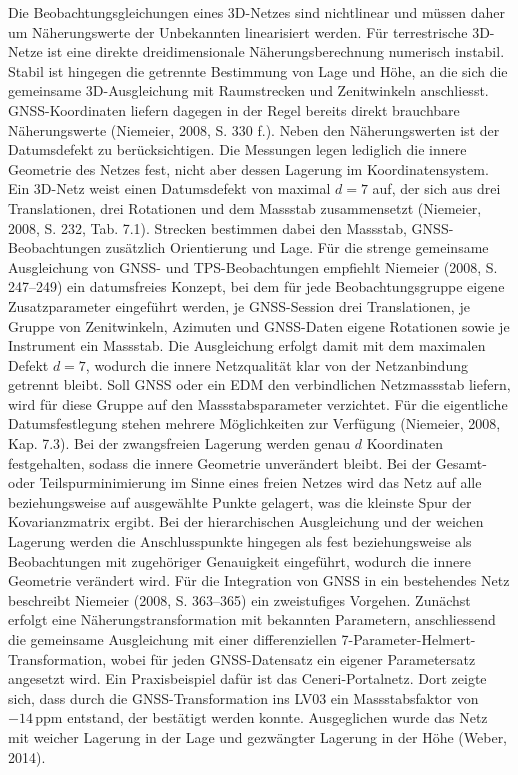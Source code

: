 Die Beobachtungsgleichungen eines 3D-Netzes sind nichtlinear und müssen daher um Näherungswerte der Unbekannten linearisiert werden. 
Für terrestrische 3D-Netze ist eine direkte dreidimensionale Näherungsberechnung numerisch instabil.
Stabil ist hingegen die getrennte Bestimmung von Lage und Höhe, an die sich die gemeinsame 3D-Ausgleichung mit Raumstrecken und Zenitwinkeln anschliesst.
GNSS-Koordinaten liefern dagegen in der Regel bereits direkt brauchbare Näherungswerte (Niemeier, 2008, S. 330 f.).
Neben den Näherungswerten ist der Datumsdefekt zu berücksichtigen. Die Messungen legen lediglich die innere Geometrie des Netzes fest, nicht aber dessen Lagerung im Koordinatensystem.
Ein 3D-Netz weist einen Datumsdefekt von maximal $d = 7$ auf, der sich aus drei Translationen, drei Rotationen und dem Massstab zusammensetzt (Niemeier, 2008, S. 232, Tab. 7.1).
Strecken bestimmen dabei den Massstab, GNSS-Beobachtungen zusätzlich Orientierung und Lage. Für die strenge gemeinsame Ausgleichung von GNSS- und TPS-Beobachtungen empfiehlt Niemeier (2008, S. 247–249) ein datumsfreies Konzept, bei dem für jede Beobachtungsgruppe eigene Zusatzparameter eingeführt werden, je GNSS-Session drei Translationen, je Gruppe von Zenitwinkeln, Azimuten und GNSS-Daten eigene Rotationen sowie je Instrument ein Massstab. Die Ausgleichung erfolgt damit mit dem maximalen Defekt $d = 7$, wodurch die innere Netzqualität klar von der Netzanbindung getrennt bleibt.
Soll GNSS oder ein EDM den verbindlichen Netzmassstab liefern, wird für diese Gruppe auf den Massstabsparameter verzichtet.
Für die eigentliche Datumsfestlegung stehen mehrere Möglichkeiten zur Verfügung (Niemeier, 2008, Kap. 7.3). Bei der zwangsfreien Lagerung werden genau $d$ Koordinaten festgehalten, sodass die innere Geometrie unverändert bleibt.
Bei der Gesamt- oder Teilspurminimierung im Sinne eines freien Netzes wird das Netz auf alle beziehungsweise auf ausgewählte Punkte gelagert, was die kleinste Spur der Kovarianzmatrix ergibt.
Bei der hierarchischen Ausgleichung und der weichen Lagerung werden die Anschlusspunkte hingegen als fest beziehungsweise als Beobachtungen mit zugehöriger Genauigkeit eingeführt, wodurch die innere Geometrie verändert wird.
Für die Integration von GNSS in ein bestehendes Netz beschreibt Niemeier (2008, S. 363–365) ein zweistufiges Vorgehen. Zunächst erfolgt eine Näherungstransformation mit bekannten Parametern, anschliessend die gemeinsame Ausgleichung mit einer differenziellen 7-Parameter-Helmert-Transformation, wobei für jeden GNSS-Datensatz ein eigener Parametersatz angesetzt wird. Ein Praxisbeispiel dafür ist das Ceneri-Portalnetz. Dort zeigte sich, dass durch die GNSS-Transformation ins LV03 ein Massstabsfaktor von $-14\,\mathrm{ppm}$ entstand, der bestätigt werden konnte. Ausgeglichen wurde das Netz mit weicher Lagerung in der Lage und gezwängter Lagerung in der Höhe (Weber, 2014).
